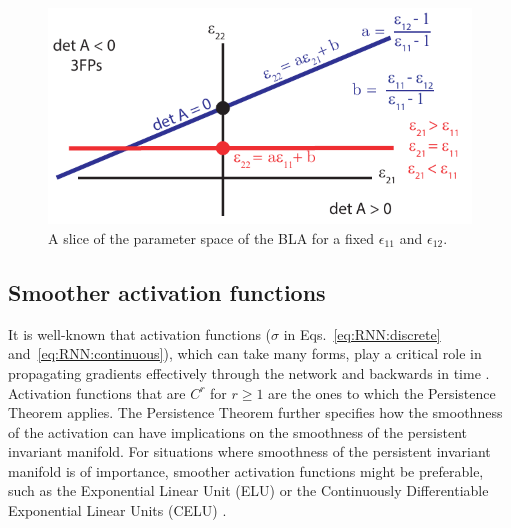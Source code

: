 \documentclass{article} %
\newcounter{ct}
\theoremstyle{definition}
\theoremstyle{remark}
\begin{document}
\begin{figure}[H]
  \centering
  \includegraphics[width=\textwidth]{bla_parameter_space}
  \caption{A slice of the parameter space of the BLA for a fixed \(\epsilon_{11}\) and \(\epsilon_{12}\). %
  }\label{fig:blaparameterspace}
\end{figure}



\subsection{Smoother activation functions}
It is well-known that activation functions (\(\sigma\) in  Eqs.~\ref{eq:RNN:discrete} and~\ref{eq:RNN:continuous}), which can take many forms, play a critical role in propagating gradients effectively through the network and backwards in time \citep{jagtap2023,ramachandran2017,hayou2019}.
Activation functions that are \(C^r\) for \(r\geq 1\) are the ones to which the Persistence Theorem applies.
The Persistence Theorem further specifies how the smoothness of the activation can have implications on the smoothness of the persistent invariant manifold.
For situations where smoothness of the persistent invariant manifold is of importance, smoother activation functions might be preferable, such as the Exponential Linear Unit (ELU)\citep{clevert2015} or the Continuously Differentiable Exponential Linear Units (CELU) \citep{barron2017}.








\end{document}
